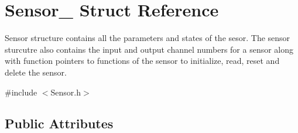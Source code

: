 \hypertarget{struct_sensor__}{}\section{Sensor\+\_\+ Struct Reference}
\label{struct_sensor__}


Sensor structure contains all the parameters and states of the sesor. The sensor sturcutre also contains the input and output channel numbers for a sensor along with function pointers to functions of the sensor to initialize, read, reset and delete the sensor.  




{\ttfamily \#include $<$Sensor.\+h$>$}

\subsection*{Public Attributes}
